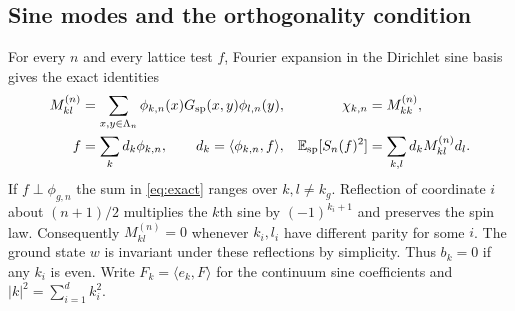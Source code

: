 \documentclass[11pt]{article}
\numberwithin{equation}{section}
\newcommand{\E}{\mathbb E}
\newcommand{\ip}[2]{\langle #1,#2\rangle}
\begin{document}
\subsection{Sine modes and the orthogonality condition}\label{sec:sines}

For every $n$ and every lattice test $f$, Fourier expansion in the
Dirichlet sine basis gives the exact identities
\begin{align}
 M^{(n)}_{kl}
  &=\sum_{x,y\in\Lambda_n}\phi_{k,n}(x)G_{\rm sp}(x,y)\phi_{l,n}(y),
 &\chi_{k,n}&=M^{(n)}_{kk},\label{eq:matrix}\\
 f&=\sum_k d_k\phi_{k,n},\qquad d_k=\ip{\phi_{k,n}}{f},
 &\E_{\rm sp}[S_n(f)^2]&=\sum_{k,l}d_k M^{(n)}_{kl}d_l .
 \label{eq:exact}
\end{align}
If $f\perp\phi_{g,n}$ the sum in \eqref{eq:exact} ranges over
$k,l\ne k_g$. Reflection of coordinate $i$ about $(n+1)/2$ multiplies
the $k$th sine by $(-1)^{k_i+1}$ and preserves the spin law.
Consequently $M^{(n)}_{kl}=0$ whenever $k_i,l_i$ have different parity
for some $i$. The ground state $w$ is invariant under these reflections
by simplicity. Thus $b_k=0$ if any $k_i$ is even. Write
$F_k=\ip{e_k}{F}$ for the continuum sine coefficients and
$|k|^2=\sum_{i=1}^d k_i^2$.
\end{document}
